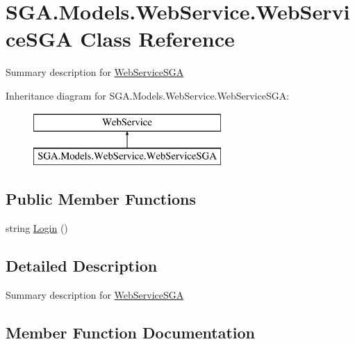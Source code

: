 \hypertarget{class_s_g_a_1_1_models_1_1_web_service_1_1_web_service_s_g_a}{}\section{S\+G\+A.\+Models.\+Web\+Service.\+Web\+Service\+S\+GA Class Reference}
\label{class_s_g_a_1_1_models_1_1_web_service_1_1_web_service_s_g_a}


Summary description for \hyperlink{class_s_g_a_1_1_models_1_1_web_service_1_1_web_service_s_g_a}{Web\+Service\+S\+GA}  


Inheritance diagram for S\+G\+A.\+Models.\+Web\+Service.\+Web\+Service\+S\+GA\+:\begin{figure}[H]
\begin{center}
\leavevmode
\includegraphics[height=2.000000cm]{class_s_g_a_1_1_models_1_1_web_service_1_1_web_service_s_g_a}
\end{center}
\end{figure}
\subsection*{Public Member Functions}
\begin{DoxyCompactItemize}
\item 
string \hyperlink{class_s_g_a_1_1_models_1_1_web_service_1_1_web_service_s_g_a_a77fc1c1ff075b21635d70b7fe995d623}{Login} ()
\end{DoxyCompactItemize}


\subsection{Detailed Description}
Summary description for \hyperlink{class_s_g_a_1_1_models_1_1_web_service_1_1_web_service_s_g_a}{Web\+Service\+S\+GA} 



\subsection{Member Function Documentation}
\mbox{\label{class_s_g_a_1_1_models_1_1_web_service_1_1_web_service_s_g_a_a77fc1c1ff075b21635d70b7fe995d623}} 
